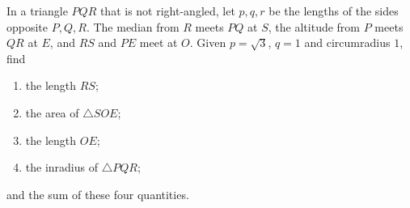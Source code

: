 In a triangle $PQR$ that is not right-angled, let $p,q,r$ be the lengths of the sides opposite $P,Q,R$. The median from $R$ meets $PQ$ at $S$, the altitude from $P$ meets $QR$ at $E$, and $RS$ and $PE$ meet at $O$. Given $p=\sqrt3$, $q=1$ and circumradius $1$, find
\begin{enumerate}
\item[(a)] the length $RS$;
\item[(b)] the area of $\triangle SOE$;
\item[(c)] the length $OE$;
\item[(d)] the inradius of $\triangle PQR$;
\end{enumerate}
and the sum of these four quantities.
